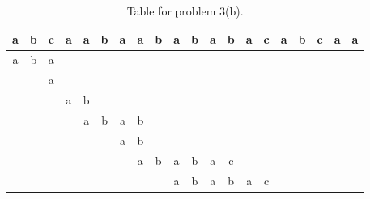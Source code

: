 \documentclass[12pt]{article}
\begin{document}
\begin{table}[!ht]
\Large{
\begin{center}
\begin{tabular}{|c|c|c|c|c|c|c|c|c|c|c|c|c|c|c|c|c|c|c|c|}
\hline
a&b&c&a&a&b&a&a&b&a&b&a&b&a&c&a&b&c&a&a\\
\hline
a&b&a&&&&&&&&&&&&&&&&&\\
\hline
& &a& & & & & & & & & & & & & & & & & \\
\hline
& & &a&b& & & & & & & & & & & & & & & \\
\hline
& & & &a&b&a&b& & & & & & & & & & & & \\
\hline
& & & & & &a&b& & & & & & & & & & & & \\
\hline
& & & & & & &a&b&a&b&a&c& & & & & & & \\
\hline
& & & & & & & & &a&b&a&b&a&c& & & & & \\
\hline
\end{tabular}
\end{center}}
\caption{Table for problem 3(b).}\label{kmp}
\end{table}

\end{document}
